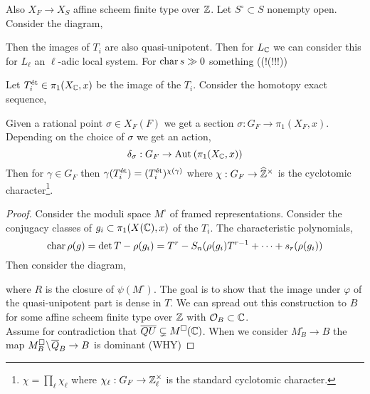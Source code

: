 \documentclass[12pt]{article}
\begin{document}
Also $X_F \to X_S$ affine scheem finite type over $\mathbb{Z}$. Let $S^\circ \subset S$ nonempty open. Consider the diagram,
\begin{center}
\end{center}
Then the images of $T_i$ are also quasi-unipotent. Then for $L_{\mathbb{C}}$ we can consider this for $L_{\ell}$ an $\ell$-adic local system. For $\operatorname{\mathrm{char}}{s} \gg 0$ something ((!(!!!))


\begin{prop}[Deligne]
Let $T_i^{\text{\'{e}t}} \in \pi_1(X_{\mathbb{C}}, x)$ be the image of the $T_i$. Consider the homotopy exact sequence,
\begin{center}
\end{center}
Given a rational point $\sigma \in X_F(F)$ we get a section $\sigma : G_F \to \pi_1(X_F, x)$. Depending on the choice of $\sigma$ we get an action,
\[ \delta_{\sigma} : G_F \to \mathrm{Aut}_{} \left( \pi_1(X_{\mathbb{C}}, x) \right) \]
Then for $\gamma \in G_F$ then $\gamma(T_i^{\text{\'{e}t}}) = (T_i^{\text{\'{e}t}})^{\chi(\gamma)}$ where $\chi : G_F \to \widehat{\mathbb{Z}}^\times$ is the cyclotomic character\footnote{$\chi = \prod_{\ell} \chi_{\ell}$ where $\chi_{\ell} : G_F \to \mathbb{Z}_\ell^\times$ is the standard cyclotomic character.}. 
\end{prop}

\begin{proof}
Consider the moduli space $M^\square$ of framed representations. Consider the conjugacy classes of $g_i \subset \pi_1(X(\mathbb{C}), x)$ of the $T_i$. The characteristic polynomials,
\[ \operatorname{\mathrm{char}}{\rho(g)} = \det{T - \rho(g_i)} = T^r - S_n(\rho(g_i) T^{r-1} + \cdots + s_r(\rho(g_i))  \]
Then consider the diagram,
\begin{center}
\end{center}
where $R$ is the closure of $\psi(M^{\square})$. The goal is to show that the image under $\varphi$ of the quasi-unipotent part is dense in $T$. We can spread out this construction to $B$ for some affine scheem finite type over $\mathbb{Z}$ with $\mathcal{O}_{B} \subset \mathbb{C}$. 
\bigskip\\
Assume for contradiction that $\overline{QU} \subsetneq M^{\square}(\mathbb{C})$. When we consider $M^{\square}_B \to B$ the map $M_B^{\square} \! \setminus \! \overline{Q}_B \to B$ is dominant (WHY)
\end{proof}
\end{document}
